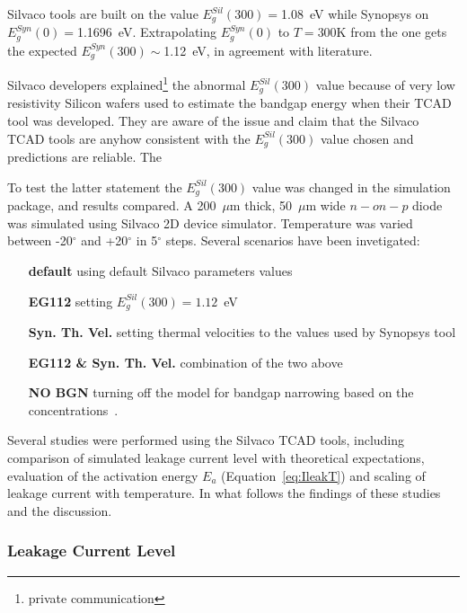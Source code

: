 Silvaco tools are built on the value $E^{Sil}_g(300)=$1.08~eV while Synopsys on $E^{Syn}_g(0)=$1.1696~eV. 
Extrapolating $E_g^{Syn}(0)$ to $T=$300K from the one gets the expected 
$E_g^{Syn}(300)\sim$1.12~eV, in agreement with literature.

Silvaco developers explained\footnote{private communication} the abnormal $E^{Sil}_g(300)$ value 
because of very low resistivity 
Silicon wafers used to estimate the bandgap energy when their TCAD tool was developed. 
They are aware of the issue and claim that the Silvaco TCAD tools are anyhow consistent with 
the $E^{Sil}_g(300)$ value chosen and predictions are reliable. The 

To test the latter statement the $E^{Sil}_g(300)$ value was changed in the simulation package, 
and results compared. 
A 200~$\mu$m thick, 50~$\mu$m wide $n-on-p$ diode was simulated using Silvaco 2D device 
simulator. Temperature was varied between -20$^{\circ}$ and +20$^{\circ}$ in 5$^{\circ}$ steps. 
Several scenarios have been invetigated:

\begin{itemize}
\item[\bf default] using default Silvaco parameters values
\item[\bf EG112] setting $E^{Sil}_g(300)=1.12$~eV
\item[\bf Syn. Th. Vel.] setting thermal velocities to the values used by Synopsys tool
\item[\bf EG112 \& Syn. Th. Vel.] combination of the two above 
\item[\bf NO BGN] turning off the model for bandgap narrowing based on the concentrations~\cite{SLOTBOOM1977279}.
\end{itemize}

Several studies were performed using the Silvaco TCAD tools,
 including comparison of simulated leakage current level with 
theoretical expectations,  evaluation of the activation energy $E_{a}$ (Equation~\ref{eq:IleakT}) 
and scaling of leakage current with temperature. In what follows the findings of these 
studies and the discussion.

\subsubsection{Leakage Current Level}




